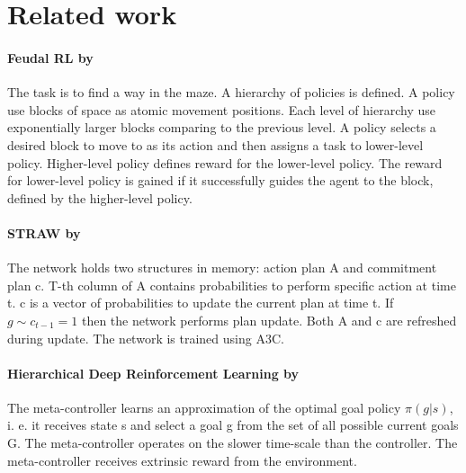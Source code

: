 \documentclass[acmsmall, nonacm]{acmart}
\begin{document}
\section{Related work}
\label{sec:related_work}

\paragraph{Feudal RL by~\citet{Dayan1992FeudalRL}} %
\label{par:feudal_rl}

The task is to find a way in the maze. A hierarchy of policies is defined. A policy use blocks of space as atomic movement positions. Each level of hierarchy use exponentially larger blocks comparing to the previous level. A policy selects a desired block to move to as its action and then assigns a task to lower-level policy. Higher-level policy defines reward for the lower-level policy. The reward for lower-level policy is gained if it successfully guides the agent to the block, defined by the higher-level policy.


\paragraph{STRAW by~\citet{Vezhnevets2016StrategicAW}} %
\label{par:straw}

The network holds two structures in memory: action plan A and commitment plan c. T-th column of A contains probabilities to perform specific action at time t. c is a vector of probabilities to update the current plan at time t. If $g \sim c_{t-1} = 1$ then the network performs plan update. Both A and c are refreshed during update. The network is trained using A3C.


\paragraph{Hierarchical Deep Reinforcement Learning by~\citet{Kulkarni2016HierarchicalDR}} %
\label{par:hierarchical_deep_rl}

The meta-controller learns an approximation of the optimal goal policy $\pi(g|s)$, i. e. it receives state s and select a goal g from the set of all possible current goals G. The meta-controller operates on the slower time-scale than the controller. The meta-controller receives extrinsic reward from the environment.
\end{document}
